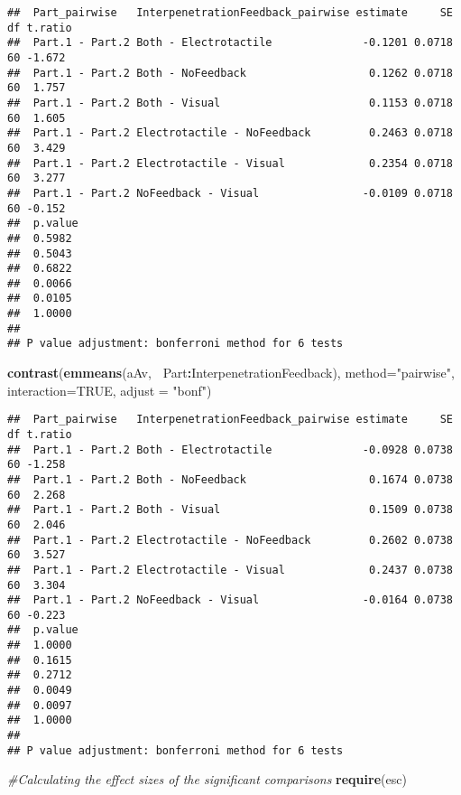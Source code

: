 \documentclass[
]{article}
\newenvironment{Shaded}{\begin{snugshade}}{\end{snugshade}}
\newcommand{\CommentTok}[1]{\textcolor[rgb]{0.56,0.35,0.01}{\textit{#1}}}
\newcommand{\DataTypeTok}[1]{\textcolor[rgb]{0.13,0.29,0.53}{#1}}
\newcommand{\KeywordTok}[1]{\textcolor[rgb]{0.13,0.29,0.53}{\textbf{#1}}}
\newcommand{\NormalTok}[1]{#1}
\newcommand{\OperatorTok}[1]{\textcolor[rgb]{0.81,0.36,0.00}{\textbf{#1}}}
\newcommand{\OtherTok}[1]{\textcolor[rgb]{0.56,0.35,0.01}{#1}}
\newcommand{\StringTok}[1]{\textcolor[rgb]{0.31,0.60,0.02}{#1}}
\begin{document}
\begin{verbatim}
##  Part_pairwise   InterpenetrationFeedback_pairwise estimate     SE df t.ratio
##  Part.1 - Part.2 Both - Electrotactile              -0.1201 0.0718 60 -1.672 
##  Part.1 - Part.2 Both - NoFeedback                   0.1262 0.0718 60  1.757 
##  Part.1 - Part.2 Both - Visual                       0.1153 0.0718 60  1.605 
##  Part.1 - Part.2 Electrotactile - NoFeedback         0.2463 0.0718 60  3.429 
##  Part.1 - Part.2 Electrotactile - Visual             0.2354 0.0718 60  3.277 
##  Part.1 - Part.2 NoFeedback - Visual                -0.0109 0.0718 60 -0.152 
##  p.value
##  0.5982 
##  0.5043 
##  0.6822 
##  0.0066 
##  0.0105 
##  1.0000 
## 
## P value adjustment: bonferroni method for 6 tests
\end{verbatim}

\begin{Shaded}
\begin{Highlighting}[]
\KeywordTok{contrast}\NormalTok{(}\KeywordTok{emmeans}\NormalTok{(aAv,}\OperatorTok{~}\StringTok{ }\NormalTok{Part}\OperatorTok{:}\NormalTok{InterpenetrationFeedback), }
         \DataTypeTok{method=}\StringTok{"pairwise"}\NormalTok{, }\DataTypeTok{interaction=}\OtherTok{TRUE}\NormalTok{, }\DataTypeTok{adjust =} \StringTok{"bonf"}\NormalTok{)}
\end{Highlighting}
\end{Shaded}

\begin{verbatim}
##  Part_pairwise   InterpenetrationFeedback_pairwise estimate     SE df t.ratio
##  Part.1 - Part.2 Both - Electrotactile              -0.0928 0.0738 60 -1.258 
##  Part.1 - Part.2 Both - NoFeedback                   0.1674 0.0738 60  2.268 
##  Part.1 - Part.2 Both - Visual                       0.1509 0.0738 60  2.046 
##  Part.1 - Part.2 Electrotactile - NoFeedback         0.2602 0.0738 60  3.527 
##  Part.1 - Part.2 Electrotactile - Visual             0.2437 0.0738 60  3.304 
##  Part.1 - Part.2 NoFeedback - Visual                -0.0164 0.0738 60 -0.223 
##  p.value
##  1.0000 
##  0.1615 
##  0.2712 
##  0.0049 
##  0.0097 
##  1.0000 
## 
## P value adjustment: bonferroni method for 6 tests
\end{verbatim}

\begin{Shaded}
\begin{Highlighting}[]
\CommentTok{#Calculating the effect sizes of the significant comparisons}
\KeywordTok{require}\NormalTok{(esc)}
\end{Highlighting}
\end{Shaded}
\end{document}
